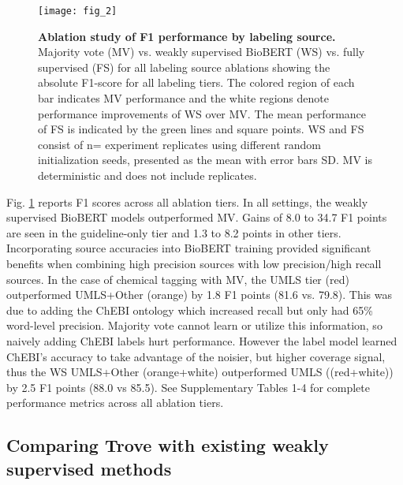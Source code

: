 \documentclass{article}
\begin{document}
\begin{figure}[H]
  \centering
  \texttt{[image: fig\_2]}
  \caption{\label{fig:ablations} \textbf{Ablation study of F1 performance by labeling source.} Majority vote (MV) vs. weakly supervised BioBERT (WS) vs. fully supervised (FS) for all labeling source ablations showing the absolute F1-score for all labeling tiers.  
{The colored region of each bar indicates MV performance and the white regions denote performance improvements of WS over MV. The mean performance of FS is indicated by the green lines and square points. WS and FS consist of n= experiment replicates using different random initialization seeds, presented as the mean with error bars  SD. MV is deterministic and does not include replicates.}}
\end{figure}



Fig. \ref{fig:ablations} reports F1 scores across all ablation tiers. 
In all settings, the weakly supervised BioBERT models outperformed MV. 
Gains of {8.0 to 34.7} F1 points are seen in the guideline-only tier and {1.3 to 8.2} points in other tiers. 
Incorporating source accuracies into BioBERT training provided significant benefits when combining high precision sources with low precision/high recall sources. 
In the case of chemical tagging with MV, the UMLS tier {(red)} outperformed UMLS+Other {(orange)} by {1.8} F1 points {(81.6 vs. 79.8)}. 
This was due to adding the ChEBI ontology which increased recall but only had 65\% word-level precision. 
Majority vote cannot learn or utilize this information, so naively adding ChEBI labels hurt performance. 
However the label model learned ChEBI's accuracy to take advantage of the noisier, but higher coverage signal, thus the WS UMLS+Other {(orange+white)} outperformed UMLS ({(red+white)}) by {2.5} F1 points ({88.0 vs 85.5}).
See Supplementary Tables 1-4 for complete performance metrics across all ablation tiers.


\subsection*{Comparing Trove with existing weakly supervised methods}
\end{document}
